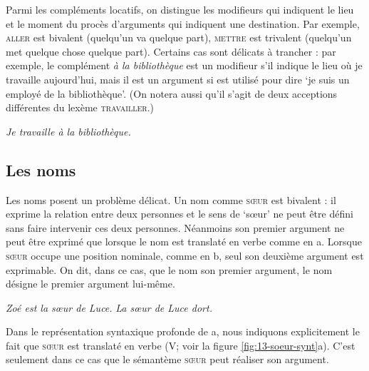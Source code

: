 Parmi les compléments locatifs, on distingue les modifieurs qui indiquent le lieu et le moment du procès d’arguments qui indiquent une destination. Par exemple, \textsc{aller} est bivalent (quelqu’un va quelque part), \textsc{mettre} est trivalent (quelqu’un met quelque chose quelque part). Certains cas sont délicats à trancher : par exemple, le complément \textit{à la bibliothèque} est un modifieur s’il indique le lieu où je travaille aujourd’hui, mais il est un argument si  est utilisé pour dire ‘je suis un employé de la bibliothèque’. (On notera aussi qu'il s'agit de deux acceptions différentes du lexème \textsc{travailler}.)

\ea\label{ex:travailler} \textit{Je travaille à la bibliothèque.}\z

\subsection{Les noms} 
Les noms posent un problème délicat. Un nom comme \textsc{sœur} est bivalent : il exprime la relation entre deux personnes et le sens de ‘sœur’ ne peut être défini sans faire intervenir ces deux personnes. Néanmoins son premier argument ne peut être exprimé que lorsque le nom est translaté en verbe comme en a. Lorsque \textsc{sœur} occupe une position nominale, comme en  b, seul son deuxième argument est exprimable. On dit, dans ce cas, que le nom  son premier argument, le nom désigne le premier argument lui-même.

\ea\label{ex:13-soeur}
\ea \textit{Zoé est la sœur de Luce.}
\ex \textit{La sœur de Luce dort.}\z\z

Dans le représentation syntaxique profonde de a, nous indiquons explicitement le fait que \textsc{sœur} est translaté en verbe (V; voir la figure \ref{fig:13-soeur-synt}a). C'est seulement dans ce cas que le sémantème \textsc{sœur} peut réaliser son argument.

